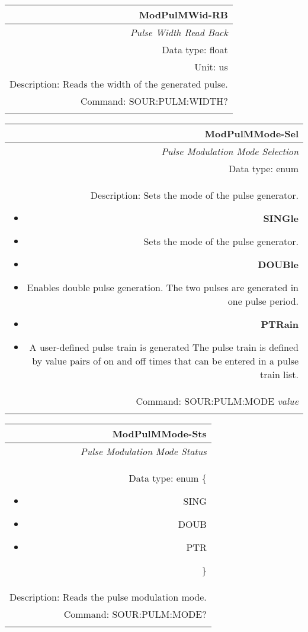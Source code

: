 \documentclass[openany]{article}
\begin{document}
		\begin{tabular}{N}
			\hline
			\bfseries ModPulMWid-RB \\ \hline
			\emph{Pulse Width Read Back} \\
			Data type: float \\
			Unit: us \\
			Description: Reads the width of the generated pulse. \\
			Command: SOUR:PULM:WIDTH? \\
			\\

		\end{tabular}


		\begin{tabular}{N}
			\hline
			\bfseries ModPulMMode-Sel \\ \hline
			\emph{Pulse Modulation Mode Selection} \\
			Data type: enum \\  
			Description: Sets the mode of the pulse generator.\begin{itemize}[noitemsep]
				\small
				\item[] \textbf{SINGle}
                                \item[] Sets the mode of the pulse generator.
                                \item[] \textbf{DOUBle}
                                \item[] Enables double pulse generation. The two pulses are generated in one pulse period.
				\item[] \textbf{PTRain}
                                \item[] A user-defined pulse train is generated The pulse train is defined by value pairs of on and off times that can be entered in a pulse train list.

			\end{itemize} \\
			Command: SOUR:PULM:MODE \emph{value} \\
			\\

		\end{tabular}


		\begin{tabular}{N}
			\hline
			\bfseries ModPulMMode-Sts \\ \hline
			\emph{Pulse Modulation Mode Status} \\
			Data type: enum \{\begin{itemize}[noitemsep]
				\small
				\item[] SING
				\item[] DOUB
				\item[] PTR
			\end{itemize}\} \\ 
			Description: Reads the pulse modulation mode. \\
			Command: SOUR:PULM:MODE? \\
			\\

		\end{tabular}
\end{document}
